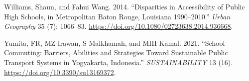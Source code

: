 \documentclass[
default
]{sn-jnl}
\newlength{\cslhangindent}
\newenvironment{CSLReferences}[2] %
 {\begin{list}{}{%
  \setlength{\itemindent}{0pt}
  \setlength{\leftmargin}{0pt}
  \setlength{\parsep}{0pt}
  \ifodd #1
   \setlength{\leftmargin}{\cslhangindent}
   \setlength{\itemindent}{-1\cslhangindent}
  \fi
  \setlength{\itemsep}{#2\baselineskip}}}
 {\end{list}}
\begin{document}
\begin{CSLReferences}{1}{0}
Williams, Shaun, and Fahui Wang. 2014. {``Disparities in Accessibility
of Public High Schools, in Metropolitan Baton Rouge, Louisiana
1990--2010.''} \emph{Urban Geography} 35 (7): 1066--83.
\url{https://doi.org/10.1080/02723638.2014.936668}.

Yumita, FR, MZ Irawan, S Malkhamah, and MIH Kamal. 2021. {``School
Commuting: Barriers, Abilities and Strategies Toward Sustainable Public
Transport Systems in Yogyakarta, Indonesia.''} \emph{{SUSTAINABILITY}}
13 (16). \url{https://doi.org/10.3390/su13169372}.

\end{CSLReferences}
\end{document}
